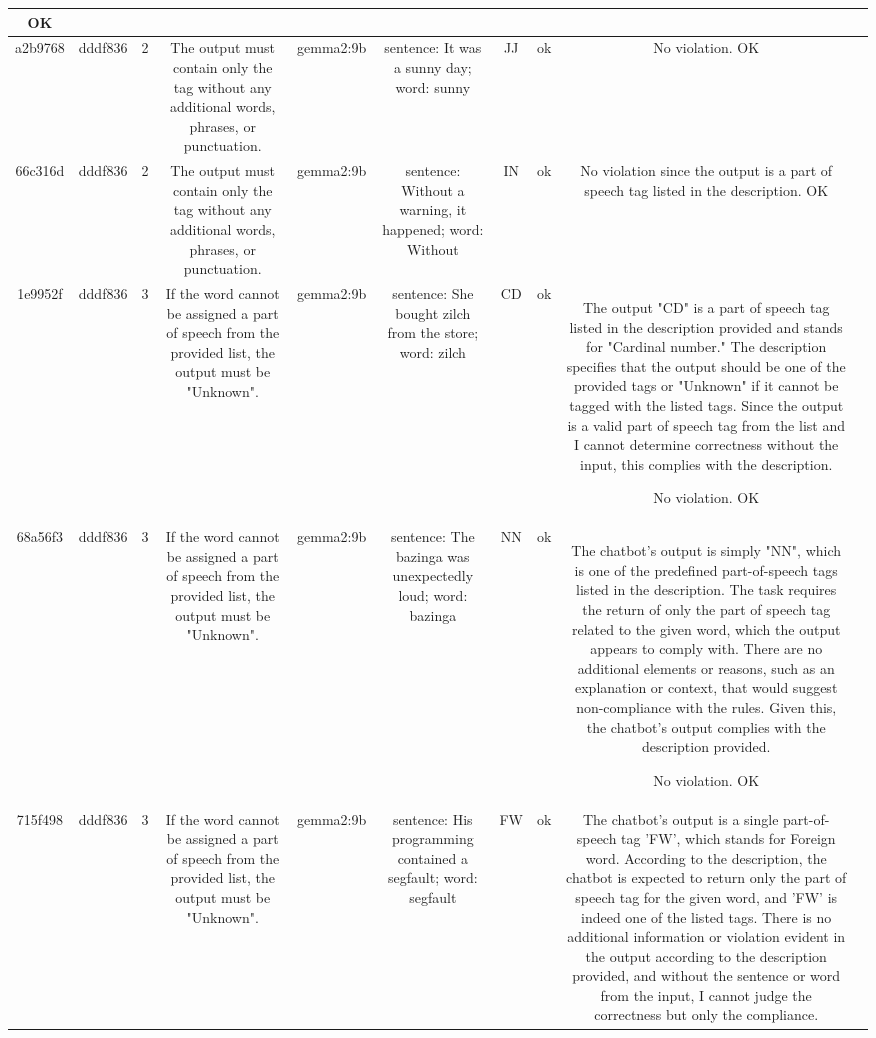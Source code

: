 \begin{table}[h!]
\begin{tabular}{|c|c|c|c|c|c|c|c|c|c|}
OK & \\
\hline
a2b9768 & dddf836 & 2 & The output must contain only the tag without any additional words, phrases, or punctuation. & gemma2:9b & sentence: It was a sunny day; word: sunny & JJ 
 & ok & No violation.
OK & \\
\hline
66c316d & dddf836 & 2 & The output must contain only the tag without any additional words, phrases, or punctuation. & gemma2:9b & sentence: Without a warning, it happened; word: Without & IN 
 & ok & No violation since the output is a part of speech tag listed in the description.
OK & \\
\hline
1e9952f & dddf836 & 3 & If the word cannot be assigned a part of speech from the provided list, the output must be "Unknown". & gemma2:9b & sentence: She bought zilch from the store; word: zilch & CD 
 & ok & The output "CD" is a part of speech tag listed in the description provided and stands for "Cardinal number." The description specifies that the output should be one of the provided tags or "Unknown" if it cannot be tagged with the listed tags. Since the output is a valid part of speech tag from the list and I cannot determine correctness without the input, this complies with the description.

No violation.
OK & \\
\hline
68a56f3 & dddf836 & 3 & If the word cannot be assigned a part of speech from the provided list, the output must be "Unknown". & gemma2:9b & sentence: The bazinga was unexpectedly loud; word: bazinga & NN 
 & ok & The chatbot's output is simply "NN", which is one of the predefined part-of-speech tags listed in the description. The task requires the return of only the part of speech tag related to the given word, which the output appears to comply with. There are no additional elements or reasons, such as an explanation or context, that would suggest non-compliance with the rules. Given this, the chatbot's output complies with the description provided.

No violation.
OK & \\
\hline
715f498 & dddf836 & 3 & If the word cannot be assigned a part of speech from the provided list, the output must be "Unknown". & gemma2:9b & sentence: His programming contained a segfault; word: segfault & FW 
 & ok & The chatbot's output is a single part-of-speech tag 'FW', which stands for Foreign word. According to the description, the chatbot is expected to return only the part of speech tag for the given word, and 'FW' is indeed one of the listed tags. There is no additional information or violation evident in the output according to the description provided, and without the sentence or word from the input, I cannot judge the correctness but only the compliance. 


\end{tabular}
\end{table}

